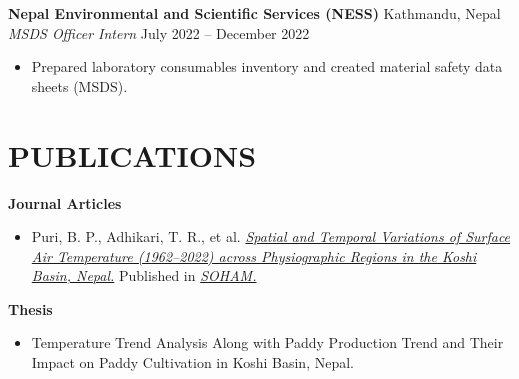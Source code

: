 \documentclass[a4paper, 11pt]{extarticle}
\begin{document}
\noindent
\textbf{Nepal Environmental and Scientific Services (NESS)} \hfill Kathmandu, Nepal\\[2pt] 
\textit{MSDS Officer Intern} \hfill July 2022 -- December 2022
\begin{itemize}
    \item Prepared laboratory consumables inventory and created material safety data sheets (MSDS).
\end{itemize}

\section*{PUBLICATIONS}
\noindent
\textbf{Journal Articles}
\begin{itemize}
    \item Puri, B. P., Adhikari, T. R., et al. \href{https://doi.org/10.3126/jhm.v12i1.72654}{\textit{Spatial and Temporal Variations of Surface Air Temperature (1962–2022) across Physiographic Regions in the Koshi Basin, Nepal.}} Published in \href{https://soham.org.np/}{\textit{SOHAM.}}  
\end{itemize}

\noindent
\textbf{Thesis}
\begin{itemize}
    \item Temperature Trend Analysis Along with Paddy Production Trend and Their Impact on Paddy Cultivation in Koshi Basin, Nepal.

\end{itemize}
\end{document}
